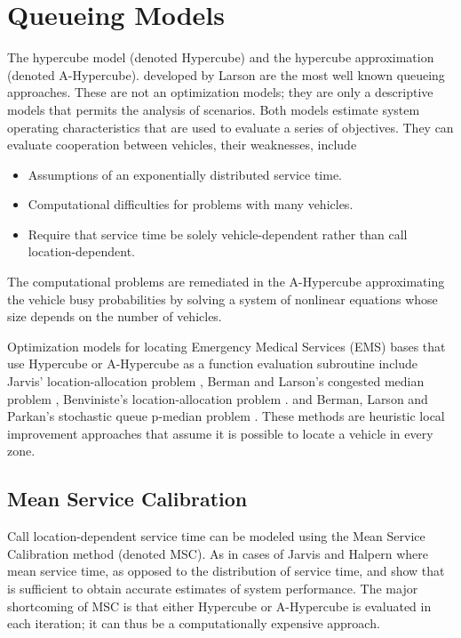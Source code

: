 \section{Queueing Models}
The hypercube model (denoted Hypercube)
and the hypercube approximation (denoted A-Hypercube).
developed by Larson  \cite{larson1974hypercube,larson1975approximating}
are the most well known queueing approaches.
These are not an optimization models;
they are only a descriptive models
that permits the analysis of scenarios.
Both models
estimate system operating characteristics
that are used to evaluate a series of objectives.
They can evaluate cooperation between vehicles,
their weaknesses, include
\begin{itemize}
\item Assumptions of an exponentially distributed service time.
\item Computational difficulties for problems with many vehicles.
\item Require that service time be solely vehicle-dependent
  rather than call location-dependent.
\end{itemize}

The computational problems are remediated in the A-Hypercube
approximating the vehicle busy probabilities
by solving a system of nonlinear equations
whose size depends on the number of vehicles.

Optimization models for locating Emergency Medical Services (EMS) bases
that use Hypercube or A-Hypercube as a function evaluation subroutine
include Jarvis' location-allocation problem \cite{jarvis1975optimization},
Berman and Larson's congested median problem \cite{berman1982median},
Benviniste's location-allocation problem \cite{benveniste1985solving}.
and Berman, Larson and Parkan's
stochastic queue p-median problem \cite{berman1987stochastic}.
These methods are heuristic local improvement approaches
that assume it is possible to locate a vehicle in every zone.

\subsection{Mean Service Calibration}
Call location-dependent service time
can be modeled using the Mean Service Calibration method (denoted MSC).
As in cases of
Jarvis \cite{jarvis1975optimization} 
and Halpern \cite{halpern1977accuracy}
where mean service time,
as opposed to the distribution of service time,
and show that
is sufficient to obtain accurate estimates of system performance.
The major shortcoming of MSC is that either
Hypercube or A-Hypercube
is evaluated in each iteration;
it can thus be a computationally expensive approach.

